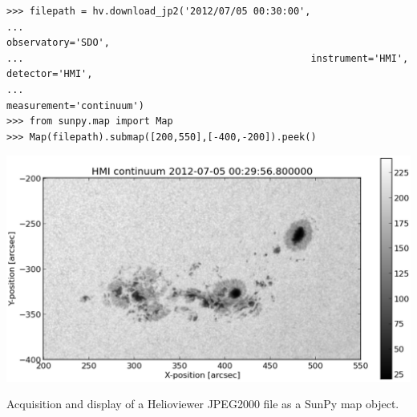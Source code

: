 \begin{listing}[H]
\begin{verbatim}
>>> filepath = hv.download_jp2('2012/07/05 00:30:00',
...                                                  observatory='SDO',
...                                                  instrument='HMI', detector='HMI', 
...                                                  measurement='continuum')
>>> from sunpy.map import Map
>>> Map(filepath).submap([200,550],[-400,-200]).peek()
\end{verbatim}
\begin{center}
\includegraphics[width=0.8\columnwidth]{helioviewer_hmi_continuum_jp2_to_map}
\end{center}
\caption{Acquisition and display of a Helioviewer JPEG2000 file as a
  SunPy map object.}
\label{code:downloadjp2}
\end{listing}
